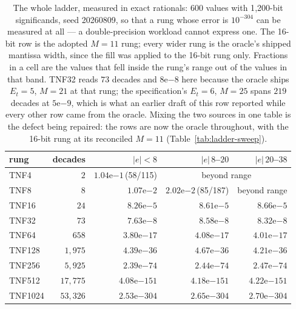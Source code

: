 \begin{table}[t]\centering
\caption{The whole ladder, measured in exact rationals: 600 values with
1{,}200-bit significands, seed 20260809, so that a rung whose error is
$10^{-304}$ can be measured at all --- a double-precision workload cannot express
one. The 16-bit row is the adopted $M{=}11$ rung; every wider rung is the oracle's
shipped mantissa width, since the fill was applied to the 16-bit rung only.
Fractions in a cell are the values that fell inside the rung's range out of the
values in that band. TNF32 reads $73$ decades and $8\mathrm{e}{-8}$ here because
the oracle ships $E_t{=}5$, $M{=}21$ at that rung; the specification's
$E_t{=}6$, $M{=}25$ spans $219$ decades at $5\mathrm{e}{-9}$, which is what an
earlier draft of this row reported while every other row came from the oracle.
Mixing the two sources in one table is the defect being repaired: the rows are now
the oracle throughout, with the 16-bit rung at its reconciled $M{=}11$
(Table~\ref{tab:ladder-sweep}).}
\label{tab:ladderacc}
\begin{tabular}{lrrrr}
\toprule
rung & decades & $|e|<8$ & $|e|\,8$--$20$ & $|e|\,20$--$38$ \\
\midrule
TNF4    & $2$      & $1.04\mathrm{e}{-1}$\,(58/115) & \multicolumn{2}{c}{beyond range} \\
TNF8    & $8$      & $1.07\mathrm{e}{-2}$ & $2.02\mathrm{e}{-2}$\,(85/187) & beyond range \\
TNF16   & $24$     & $8.26\mathrm{e}{-5}$   & $8.61\mathrm{e}{-5}$   & $8.66\mathrm{e}{-5}$ \\
TNF32   & $73$     & $7.63\mathrm{e}{-8}$   & $8.58\mathrm{e}{-8}$   & $8.32\mathrm{e}{-8}$ \\
TNF64   & $658$    & $3.80\mathrm{e}{-17}$  & $4.08\mathrm{e}{-17}$  & $4.01\mathrm{e}{-17}$ \\
TNF128  & $1{,}975$  & $4.39\mathrm{e}{-36}$  & $4.67\mathrm{e}{-36}$  & $4.21\mathrm{e}{-36}$ \\
TNF256  & $5{,}925$  & $2.39\mathrm{e}{-74}$  & $2.44\mathrm{e}{-74}$  & $2.47\mathrm{e}{-74}$ \\
TNF512  & $17{,}775$ & $4.08\mathrm{e}{-151}$ & $4.18\mathrm{e}{-151}$ & $4.22\mathrm{e}{-151}$ \\
TNF1024 & $53{,}326$ & $2.53\mathrm{e}{-304}$ & $2.65\mathrm{e}{-304}$ & $2.70\mathrm{e}{-304}$ \\
\bottomrule
\end{tabular}
\end{table}

